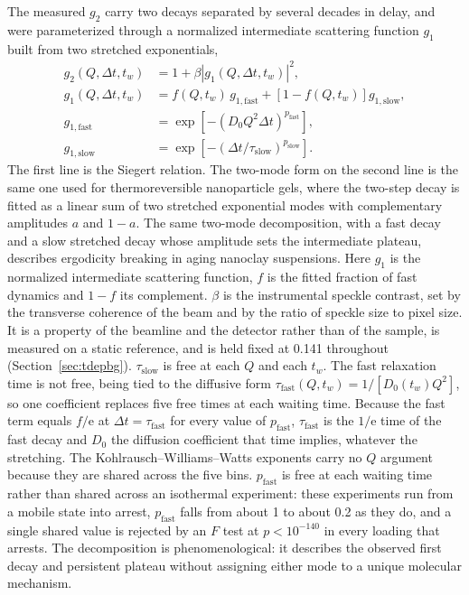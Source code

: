 \documentclass[11pt]{article}
\begin{document}
The measured $g_2$ carry two decays separated by several decades in delay, and were parameterized through a normalized intermediate scattering function $g_1$ built from two stretched exponentials,
\begin{equation}
\begin{aligned}
 g_2(Q,\Delta t,t_w)&=1+\beta\left|g_1(Q,\Delta t,t_w)\right|^{2},\\
 g_1(Q,\Delta t,t_w)&=f(Q,t_w)\,g_{1,\mathrm{fast}}+\left[1-f(Q,t_w)\right]g_{1,\mathrm{slow}},\\
 g_{1,\mathrm{fast}}&=\exp\!\left[-\left(D_0Q^{2}\Delta t\right)^{p_{\mathrm{fast}}}\right],\\
 g_{1,\mathrm{slow}}&=\exp\!\left[-\left(\Delta t/\tau_{\mathrm{slow}}\right)^{p_{\mathrm{slow}}}\right].
\end{aligned}
 \label{eq:si-twomode}
 \end{equation}
The first line is the Siegert relation. The two-mode form on the second line is the same one used for thermoreversible nanoparticle gels, where the two-step decay is fitted as a linear sum of two stretched exponential modes with complementary amplitudes $a$ and $1-a$.\cite{Bahadur2019-ln} The same two-mode decomposition, with a fast decay and a slow stretched decay whose amplitude sets the intermediate plateau, describes ergodicity breaking in aging nanoclay suspensions.\cite{Chen2020-fn} Here $g_1$ is the normalized intermediate scattering function, $f$ is the fitted fraction of fast dynamics and $1-f$ its complement. $\beta$ is the instrumental speckle contrast, set by the transverse coherence of the beam and by the ratio of speckle size to pixel size. It is a property of the beamline and the detector rather than of the sample, is measured on a static reference, and is held fixed at 0.141 throughout (Section~\ref{sec:tdepbg}). $\tau_{\mathrm{slow}}$ is free at each $Q$ and each $t_w$. The fast relaxation time is not free, being tied to the diffusive form $\tau_{\mathrm{fast}}(Q,t_w)=1/[D_0(t_w)Q^2]$, so one coefficient replaces five free times at each waiting time. Because the fast term equals $f/\mathrm{e}$ at $\Delta t=\tau_{\mathrm{fast}}$ for every value of $p_{\mathrm{fast}}$, $\tau_{\mathrm{fast}}$ is the $1/\mathrm{e}$ time of the fast decay and $D_0$ the diffusion coefficient that time implies, whatever the stretching. The Kohlrausch--Williams--Watts exponents carry no $Q$ argument because they are shared across the five bins. $p_{\mathrm{fast}}$ is free at each waiting time rather than shared across an isothermal experiment: these experiments run from a mobile state into arrest, $p_{\mathrm{fast}}$ falls from about 1 to about 0.2 as they do, and a single shared value is rejected by an $F$ test at $p<10^{-140}$ in every loading that arrests. The decomposition is phenomenological: it describes the observed first decay and persistent plateau without assigning either mode to a unique molecular mechanism.
\end{document}
